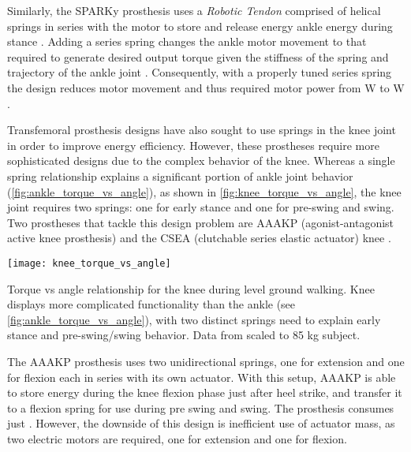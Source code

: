 Similarly, the SPARKy prosthesis uses a \emph{Robotic Tendon} comprised of
helical springs in series with the motor to store and release energy ankle
energy during stance \citep{hitt2007sparky, bellman2008sparky,
holgate2008sparky}. Adding a series spring changes the ankle motor movement to
that required to generate desired output torque given the stiffness of the
spring and trajectory of the ankle joint . Consequently, with a properly tuned series spring the
design reduces motor movement and thus required motor power from \unit[250]{W}
to \unit[77]{W} \citep{hitt2007sparky}.

Transfemoral prosthesis designs have also sought to use springs in the knee
joint in order to improve energy efficiency. However, these prostheses require
more sophisticated designs due to the complex behavior of the knee. Whereas a
single spring relationship explains a significant portion of ankle joint
behavior (\cref{fig:ankle_torque_vs_angle}), as shown in
\cref{fig:knee_torque_vs_angle}, the knee joint requires two springs: one for
early stance and one for pre-swing and swing. Two prostheses that tackle this
design problem are AAAKP (agonist-antagonist active knee prosthesis)
\citep{martinez2008design, martinez2011antagonistic} and the CSEA (clutchable
series elastic actuator) knee \citep{rouse2014clutchable, rouse2015design}.

\begin{marginfigure}
    \centering
    \texttt{[image: knee\_torque\_vs\_angle]}
    \caption{Torque vs angle relationship for the knee during level ground
    walking. Knee displays more complicated functionality than the ankle (see
    \cref{fig:ankle_torque_vs_angle}), with two distinct springs need to explain
    early stance and pre-swing/swing behavior. Data from
    \citet{winter2009biomechanics} scaled to 85 kg subject.}
    \label{fig:knee_torque_vs_angle}
\end{marginfigure}

The AAAKP prosthesis uses two unidirectional springs, one for extension and one
for flexion each in series with its own actuator. With this setup,
AAAKP is able to store energy during the knee flexion phase just after heel
strike, and transfer it to a flexion spring for use during pre swing and swing.
The prosthesis consumes just . However, the downside of
this design is inefficient use of actuator mass, as two electric motors are
required, one for extension and one for flexion.

